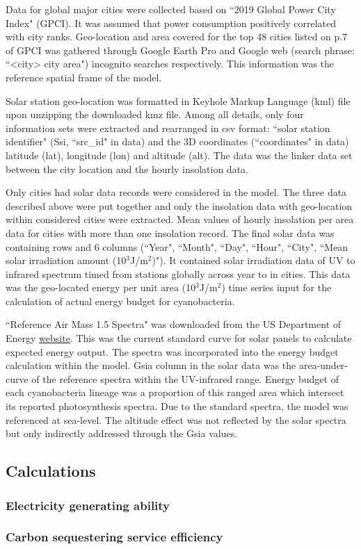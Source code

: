 \documentclass[../thesis.tex]{subfiles} %
\begin{document}
Data for global major cities were collected based on ``2019 Global Power City Index"\autocite{GPCI2019_summary} (GPCI).  It was assumed that power consumption positively correlated with city ranks.  Geo-location and area covered for the top 48 cities listed on p.7 of GPCI was gathered through Google Earth Pro\autocite{gEarth} and Google web (search phrase: ``<city> city area") incognito searches respectively.  This information was the reference spatial frame of the model.

Solar station geo-location was formatted in Keyhole Markup Language (kml) file upon unzipping the downloaded kmz file.  Among all details, only four information sets were extracted and rearranged in csv format: ``solar station identifier" (Ssi, ``src\_id" in data) and the 3D coordinates (``coordinates" in data) latitude (lat), longitude (lon) and altitude (alt).  The data was the linker data set between the city location and the hourly insolation data.

Only cities had solar data records were considered in the model.  The three data described above were put together and only the insolation data with geo-location within considered cities were extracted.  Mean values of hourly insolation per area data for cities with more than one insolation record.  The final solar data was containing 
 rows and 6 columns (``Year", ``Month", ``Day", ``Hour", ``City", ``Mean solar irradiation amount (10$^{3}$J/m$^{2}$)").  It contained solar irradiation data of UV to infrared spectrum timed from 
 stations globally across year 
 to 
 in 
 cities.  This data was the geo-located energy per unit area (10$^{3}$J/m$^{2}$) time series input for the calculation of actual energy budget for cyanobacteria.

``Reference Air Mass 1.5 Spectra" was downloaded from the US Department of Energy \href{https://www.nrel.gov/grid/solar-resource/spectra-am1.5.html}{website}.  This was the current standard curve for solar panels to calculate expected energy output.  The spectra was incorporated into the energy budget calculation within the model.  Gsia column in the solar data was the area-under-curve of the reference spectra within the UV-infrared range.  Energy budget of each cyanobacteria lineage was a proportion of this ranged area which intersect its reported photosynthesis spectra.  Due to the standard spectra, the model was referenced at sea-level.  The altitude effect was not reflected by the solar spectra but only indirectly addressed through the Gsia values.

\subsection{Calculations}
\subsubsection{Electricity generating ability}

\subsubsection{Carbon sequestering service efficiency}
\end{document}
